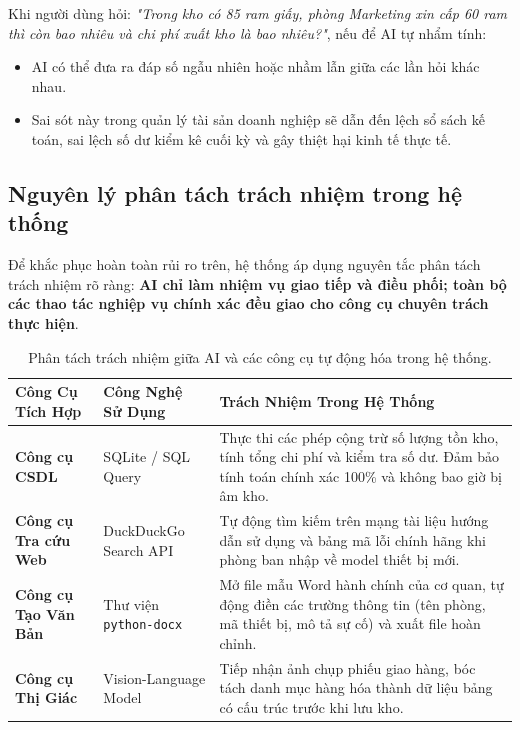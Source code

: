 \documentclass[11pt,a4paper]{article}
\begin{document}
Khi người dùng hỏi: \textit{"Trong kho có 85 ram giấy, phòng Marketing xin cấp 60 ram thì còn bao nhiêu và chi phí xuất kho là bao nhiêu?"}, nếu để AI tự nhẩm tính:
\begin{itemize}
    \item AI có thể đưa ra đáp số ngẫu nhiên hoặc nhầm lẫn giữa các lần hỏi khác nhau.
    \item Sai sót này trong quản lý tài sản doanh nghiệp sẽ dẫn đến lệch sổ sách kế toán, sai lệch số dư kiểm kê cuối kỳ và gây thiệt hại kinh tế thực tế.
\end{itemize}

\subsection{Nguyên lý phân tách trách nhiệm trong hệ thống}
Để khắc phục hoàn toàn rủi ro trên, hệ thống áp dụng nguyên tắc phân tách trách nhiệm rõ ràng: \textbf{AI chỉ làm nhiệm vụ giao tiếp và điều phối; toàn bộ các thao tác nghiệp vụ chính xác đều giao cho công cụ chuyên trách thực hiện}.

\begin{table}[H]
\centering
\small
\renewcommand{\arraystretch}{1.25}
\begin{tabularx}{\textwidth}{p{3.2cm} p{4.2cm} >{\raggedright\arraybackslash}X}
\toprule
\textbf{Công Cụ Tích Hợp} & \textbf{Công Nghệ Sử Dụng} & \textbf{Trách Nhiệm Trong Hệ Thống} \\
\midrule
\textbf{Công cụ CSDL} & SQLite / SQL Query & Thực thi các phép cộng trừ số lượng tồn kho, tính tổng chi phí và kiểm tra số dư. Đảm bảo tính toán chính xác 100\% và không bao giờ bị âm kho. \\
\addlinespace
\textbf{Công cụ Tra cứu Web} & DuckDuckGo Search API & Tự động tìm kiếm trên mạng tài liệu hướng dẫn sử dụng và bảng mã lỗi chính hãng khi phòng ban nhập về model thiết bị mới. \\
\addlinespace
\textbf{Công cụ Tạo Văn Bản} & Thư viện \texttt{python-docx} & Mở file mẫu Word hành chính của cơ quan, tự động điền các trường thông tin (tên phòng, mã thiết bị, mô tả sự cố) và xuất file hoàn chỉnh. \\
\addlinespace
\textbf{Công cụ Thị Giác} & Vision-Language Model & Tiếp nhận ảnh chụp phiếu giao hàng, bóc tách danh mục hàng hóa thành dữ liệu bảng có cấu trúc trước khi lưu kho. \\
\bottomrule
\end{tabularx}
\caption{Phân tách trách nhiệm giữa AI và các công cụ tự động hóa trong hệ thống.}
\end{table}
\end{document}
